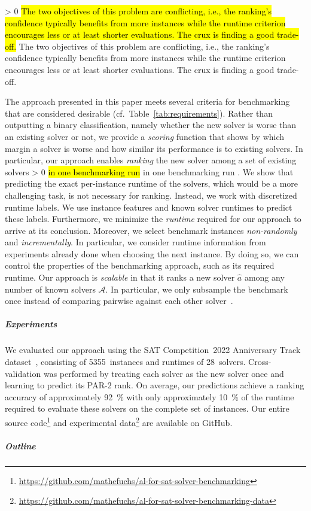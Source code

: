 \documentclass[sn-basic, Numbered]{sn-jnl} %
\newcommand{\showchanges}{1} %
\newcommand{\change}[1]{\ifnum \showchanges > 0 \sethlcolor{yellow}\hl{#1} \else #1 \fi}
\begin{document}
\change{
The two objectives of this problem are conflicting, i.e., the ranking's confidence typically benefits from more instances while the runtime criterion encourages less or at least shorter evaluations.
The crux is finding a good trade-off.
}

The approach presented in this paper meets several criteria for benchmarking that are considered desirable (cf.~Table~\ref{tab:requirements}).
Rather than outputting a binary classification, namely whether the new solver is worse than an existing solver or not, we provide a \emph{scoring} function that shows by which margin a solver is worse and how similar its performance is to existing solvers.
In particular, our approach enables \emph{ranking} the new solver among a set of existing solvers \change{in one benchmarking run}.
We show that predicting the exact per-instance runtime of the solvers, which would be a more challenging task, is not necessary for ranking.
Instead, we work with discretized runtime labels.
We use instance features and known solver runtimes to predict these labels.
Furthermore, we minimize the \emph{runtime} required for our approach to arrive at its conclusion.
Moreover, we select benchmark instances \emph{non-randomly} and \emph{incrementally}.
In particular, we consider runtime information from experiments already done when choosing the next instance.
By doing so, we can control the properties of the benchmarking approach, such as its required runtime.
Our approach is \emph{scalable} in that it ranks a new solver $\hat{a}$ among any number of known solvers $\mathcal{A}$.
In particular, we only subsample the benchmark once instead of comparing pairwise against each other solver~\cite{MatriconAFSH21}.

\subparagraph{Experiments}

We evaluated our approach using the SAT Competition~2022 Anniversary Track dataset~\cite{sat2022}, consisting of 5355~instances and runtimes of 28~solvers.
Cross-validation was performed by treating each solver as the new solver once and learning to predict its PAR-2 rank.
On average, our predictions achieve a ranking accuracy of approximately \SI{92}{\%} with only approximately \SI{10}{\%} of the runtime required to evaluate these solvers on the complete set of instances.
Our entire source code\footnote{\url{https://github.com/mathefuchs/al-for-sat-solver-benchmarking}} and experimental data\footnote{\url{https://github.com/mathefuchs/al-for-sat-solver-benchmarking-data}} are available on GitHub.

\subparagraph{Outline}
\end{document}
